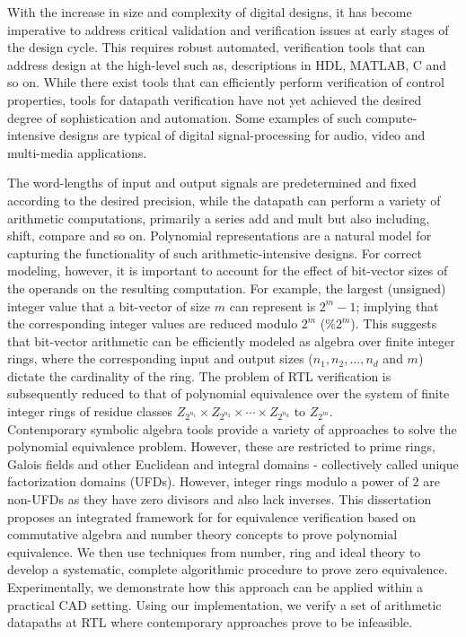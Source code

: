 With the increase in size and complexity of digital designs, it has
become imperative to address critical validation and verification
issues at early stages of the design cycle. This requires robust
automated, verification tools that can address design at the
high-level such as, descriptions in HDL, MATLAB, C and so on.  While
there exist tools that can efficiently perform verification of control
properties, tools for datapath verification have not yet achieved the
desired degree of sophistication and automation. Some examples of such
compute-intensive designs are typical of digital signal-processing for
audio, video and multi-media applications.

The word-lengths of input and output signals are predetermined and
fixed according to the desired precision, while the datapath can
perform a variety of arithmetic computations, primarily a series {\sc
add} and {mult} but also including, {\sc shift}, {\sc compare} and so
on. Polynomial representations are a natural model for
capturing the functionality of such arithmetic-intensive designs. For
correct modeling, however, it is important to account for the effect
of bit-vector sizes of the operands on the resulting computation. For
example, the largest (unsigned) integer value that a bit-vector of
size $m$ can represent is $2^m -1$; implying that the corresponding
integer values are reduced modulo $2^m$ ($\% 2^m$). This suggests that
bit-vector arithmetic can be efficiently modeled as algebra over
finite integer rings, where the corresponding input and output sizes
($n_1, n_2, \ldots, n_d$ and $m$) dictate the cardinality of the
ring. The problem of RTL verification is subsequently reduced to that
of polynomial equivalence over the system of finite integer rings of
residue classes $Z_{2^{n_1}} \times Z_{2^{n_2}} \times \cdots \times
Z_{2^{n_d}}$ to $Z_{2^m}$.\\

Contemporary symbolic algebra tools provide a variety of approaches to
solve the polynomial equivalence problem. However, these are
restricted to prime rings, Galois fields and other Euclidean and
integral domains - collectively called unique factorization domains
(UFDs). However, integer rings modulo a power of $2$ are non-UFDs as
they have zero divisors and also lack inverses. This dissertation
proposes an integrated framework for for equivalence verification
based on commutative algebra and number theory concepts to prove
polynomial equivalence. We then use techniques from number, ring and
ideal theory to develop a systematic, complete algorithmic procedure
to prove zero equivalence. Experimentally, we demonstrate how this
approach can be applied within a practical CAD setting. Using our
implementation, we verify a set of arithmetic datapaths at RTL where
contemporary approaches prove to be infeasible.


